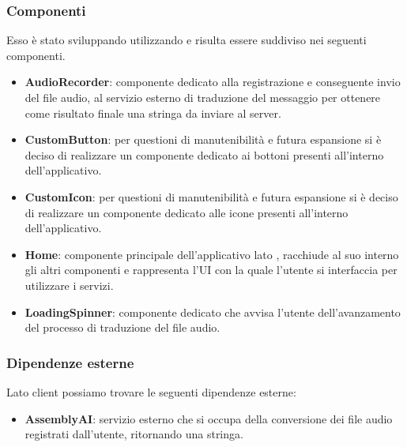 \subsubsection{Componenti}
Esso è stato sviluppando utilizzando  e risulta essere suddiviso nei seguenti componenti. 
\begin{itemize}
    \item \textbf{AudioRecorder}: componente dedicato alla registrazione e conseguente invio del file audio, al servizio esterno di traduzione del messaggio per ottenere come risultato finale una stringa da inviare al server. 
    \item \textbf{CustomButton}: per questioni di manutenibilità e futura espansione si è deciso di realizzare un componente dedicato ai bottoni presenti all'interno dell'applicativo. 
    \item \textbf{CustomIcon}:  per questioni di manutenibilità e futura espansione si è deciso di realizzare un componente dedicato alle icone presenti all'interno dell'applicativo. 
    \item \textbf{Home}: componente principale dell'applicativo lato , racchiude al suo interno gli altri componenti e rappresenta l'UI con la quale l'utente si interfaccia per utilizzare i servizi. 
    \item \textbf{LoadingSpinner}: componente dedicato che avvisa l'utente dell'avanzamento del processo di traduzione del file audio. 
\end{itemize}
\subsubsection{Dipendenze esterne}
Lato client possiamo trovare le seguenti dipendenze esterne:
\begin{itemize}
    \item \textbf{AssemblyAI}: servizio esterno che si occupa della conversione dei file audio registrati dall'utente, ritornando una stringa. 
\end{itemize}
\newpage

